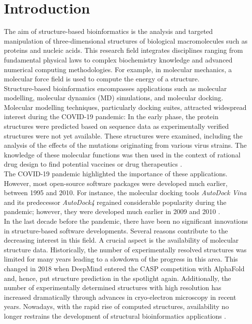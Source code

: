 \section{Introduction}


The aim of structure-based bioinformatics is the analysis and targeted manipulation of three-dimensional structures of biological macromolecules such as proteins and nucleic acids. This research field integrates disciplines ranging from fundamental physical laws to complex biochemistry knowledge and advanced numerical computing methodologies. For example, in molecular mechanics, a molecular force field is used to compute the energy of a structure.  \\
Structure-based bioinformatics encompasses applications such as molecular modelling, molecular dynamics (MD) simulations, and molecular docking.  Molecular modelling techniques, particularly docking suites, attracted widespread interest during the COVID-19 pandemic: In the early phase, the protein structures were predicted based on sequence data as experimentally verified structures were not yet available. These structures were examined, including the analysis of the effects of the mutations originating from various virus strains. The knowledge of these molecular functions was then used in the context of rational drug design to find potential vaccines or drug therapeutics \cite{Kumar2021}. \\
The COVID-19 pandemic highlighted the importance of these applications. However, most open-source software packages were developed much earlier, between 1995 and 2010. For instance, the molecular docking tools \textit{AutoDock Vina} and its predecessor \textit{AutoDock4} regained considerable popularity during the pandemic; however, they were developed much earlier in 2009 and 2010 \cite{Trott2010, Morris2009AutoDock4AA}.\\
In the last decade before the pandemic, there have been no significant innovations in structure-based software developments. Several reasons contribute to the decreasing interest in this field. A crucial aspect is the availability of molecular structure data. Historically, the number of experimentally resolved structures was limited for many years \cite{berman2000protein} leading to a slowdown of the progress in this area. This changed in 2018 when DeepMind entered the CASP competition with AlphaFold \cite{deepmind} and, hence, put structure prediction in the spotlight again. Additionally, the number of experimentally determined structures with high resolution has increased dramatically through advances in cryo-electron microscopy in recent years. Nowadays, with the rapid rise of computed structures, availability no longer restrains the development of structural bioinformatics applications \cite{AlphaFoldDB2023}. \\

